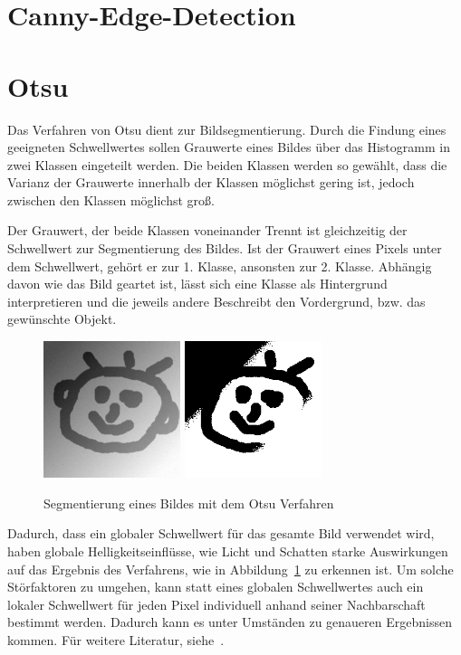 \section{Canny-Edge-Detection} %

\section{Otsu} %
Das Verfahren von Otsu dient zur Bildsegmentierung.
Durch die Findung eines geeigneten Schwellwertes sollen Grauwerte eines Bildes über das Histogramm in zwei Klassen eingeteilt werden.
Die beiden Klassen werden so gewählt, dass die Varianz der Grauwerte innerhalb der Klassen möglichst gering ist, jedoch zwischen den Klassen möglichst groß.

Der Grauwert, der beide Klassen voneinander Trennt ist gleichzeitig der Schwellwert zur Segmentierung des Bildes. Ist der Grauwert eines Pixels unter dem Schwellwert, gehört er zur 1. Klasse, ansonsten zur 2. Klasse.
Abhängig davon wie das Bild geartet ist, lässt sich eine Klasse als Hintergrund interpretieren und die jeweils andere Beschreibt den Vordergrund, bzw. das gewünschte Objekt.

\begin{figure}[ht]
   \centering
     \includegraphics[width=4cm]{Bilder/otsu-1}
     \includegraphics[width=4cm]{Bilder/otsu-2} \\
 \caption{Segmentierung eines Bildes mit dem Otsu Verfahren}
 \label{fig:Otsu}
\end{figure}

Dadurch, dass ein globaler Schwellwert für das gesamte Bild verwendet wird, haben globale Helligkeitseinflüsse, wie Licht und Schatten starke Auswirkungen auf das Ergebnis des Verfahrens, wie in Abbildung~\ref{fig:Otsu} zu erkennen ist. Um solche Störfaktoren zu umgehen, kann statt eines globalen Schwellwertes auch ein lokaler Schwellwert für jeden Pixel individuell anhand seiner Nachbarschaft bestimmt werden. Dadurch kann es unter Umständen zu genaueren Ergebnissen kommen.
Für weitere Literatur, siehe~\cite{Otsu}.

